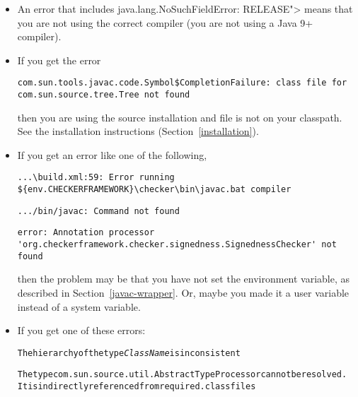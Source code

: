 \begin{itemize}
\item
  \label{no-such-field-error-release}
  An error that includes \<java.lang.NoSuchFieldError: RELEASE"> means that
  you are not using the correct compiler (you are not using a Java 9+ compiler).

\item
If you get the error

\begin{smaller}
\begin{Verbatim}
com.sun.tools.javac.code.Symbol$CompletionFailure: class file for com.sun.source.tree.Tree not found
\end{Verbatim}
\end{smaller}

\noindent
then you are using the source installation and file  is not
on your classpath.  See the installation instructions
(Section~\ref{installation}).

\item
If you get an error like one of the following,

\begin{smaller}
\begin{Verbatim}
...\build.xml:59: Error running ${env.CHECKERFRAMEWORK}\checker\bin\javac.bat compiler
\end{Verbatim}

\begin{Verbatim}
.../bin/javac: Command not found
\end{Verbatim}

\begin{Verbatim}
error: Annotation processor 'org.checkerframework.checker.signedness.SignednessChecker' not found
\end{Verbatim}
\end{smaller}

\noindent
then the problem may be that you have not set the  environment
variable, as described in Section~\ref{javac-wrapper}.  Or, maybe
you made it a user variable instead of a system variable.

\item
If you get one of these errors:

\begin{alltt}
The hierarchy of the type \emph{ClassName} is inconsistent

The type com.sun.source.util.AbstractTypeProcessor cannot be resolved.
  It is indirectly referenced from required .class files
\end{alltt}


\end{itemize}

